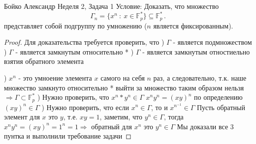 \documentclass[a4paper,12pt]{article}
\numberwithin{equation}{section}
\theoremstyle{plain}
\theoremstyle{definition}
\theoremstyle{remark}
\def\F{\mathbb {F}}
\begin{document}

Бойко Александр
\newline
\newline
Неделя 2, Задача 1 \newline
Условие:
Доказать, что множество 
$$
\Gamma_n = \{ x^n ~:~ x\in \F^{*}_p \} \subseteq \F^{*}_p \,.
$$
представляет собой подгруппу по умножению ($n$ является фиксированным). 
\begin{proof} \newline

Для доказательства требуется проверить, что ) $\Gamma$ - является подмножеством ) $\Gamma$ - является замкнутым относительно * ) $\Gamma$ - является замкнутым отностиельно взятия обратного элемента \newline

) $x^n$ - это умноение элемента $x$ самого на себя $n$ раз, а следовательно, т.к. наше множество замкнуто относительно * выйти за множество таким образом нельзя $\Rightarrow \Gamma \subset \F_p^*$ ) Нужно проверить, что $x^n * y^n \in \Gamma$ \newline
$x^n y^n = (xy)^n$ по определению \newline
$(xy)^n \in \Gamma$ ) Нужно проверить, что если $x^n \in \Gamma$, то и $x^{n^{-1}} \in \Gamma$ \newline
Пусть обратный элемент для $x$ это $y$, т.е. $xy = 1$, заметим, что $y^n \in \Gamma$, тогда $x^n y^n = (xy)^n = 1^n = 1 \Rightarrow$ обратный для $x^n$ это $y^n \in \Gamma$ \newline
\newline
Мы доказали все 3 пунтка и выполнили требование задачи

\end{proof}
\end{document}
